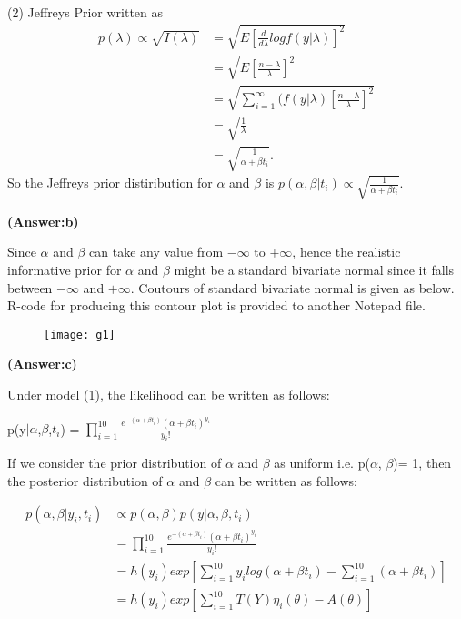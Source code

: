 \documentclass[10pt]{article}
\begin{document}
(2) Jeffreys Prior written as 
\begin{equation*}
\begin{split}
p(\lambda)\propto \sqrt{I(\lambda)}&=\sqrt{E[\frac{d}{d\lambda}logf(y|\lambda)]^2}\\
&=\sqrt{E[\frac{n-\lambda}{\lambda}]^2}\\
&=\sqrt{\sum_{i=1}^\infty(f(y|\lambda)[\frac{n-\lambda}{\lambda}]^2}\\
&=\sqrt{\frac{1}{\lambda}}\\
&=\sqrt{\frac{1}{\alpha+\beta t_{i}}}.
\end{split}
\end{equation*}
So the Jeffreys prior distiribution for $\alpha$ and $\beta$ is $p(\alpha, \beta|t_{i})\propto\sqrt{\frac{1}{\alpha+\beta t_{i}}}.$
\begin{center}
\textbf{(Answer:b)}
\end{center}
Since $\alpha$ and $\beta$ can take any value from $-\infty$ to $+\infty$, hence the realistic informative prior for $\alpha$ and $\beta$ might be a standard bivariate normal since it falls between $-\infty$ and $+\infty$. Coutours of standard bivariate normal is given as below. R-code for producing this contour plot is provided to another Notepad file.
\begin{figure}[h]
\begin{center}
\texttt{[image: g1]}
\end{center}
\end{figure}
\begin{center}
\textbf{(Answer:c)}
\end{center}
Under model (1), the likelihood can be written as follows:
\begin{center}
p(y$|\alpha$,$\beta$,$t_{i}$) = $\prod_{i=1}^{10}\frac{e^{-(\alpha+\beta t_{i})}(\alpha+\beta t_{i})^{y_{i}}}{y_{i}!}$
\end{center}
If we consider the prior distribution of $\alpha$ and $\beta$ as uniform i.e. p($\alpha$, $\beta$)= 1, then the posterior distribution of $\alpha$ and $\beta$ can be written as follows:
\begin{center}
\begin{equation*}
\begin{split}
p(\alpha,\beta|y_{i},t_{i})&\propto p(\alpha, \beta)p(y|\alpha,\beta,t_{i})\\
&=\prod_{i=1}^{10}\frac{e^{-(\alpha+\beta t_{i})}(\alpha+\beta t{_i})^{y_{i}}}{y_{i}!}\\
&=h(y_{i})exp[\sum_{i=1}^{10}y_{i}log(\alpha+\beta t_{i})-\sum_{i=1}^{10}(\alpha+\beta t_{i})]\\
&=h(y_{i})exp[\sum_{i=1}^{10}T(Y)\eta_{i}(\theta)-A(\theta)]
\end{split}
\end{equation*}
\end{center}
\end{document}
